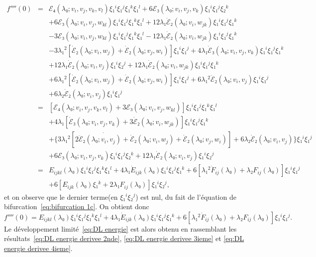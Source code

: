 \documentclass[12pt, final]{amsart}
\theoremstyle{definition}
\begin{document}
\begin{eqnarray*}
  f''''(0) & = & ℰ₄(λ₀ ; v_i, v_j, v_k {, v_l} ) ξ₁^i
  ξ₁^j ξ₁^k ξ₁^l + 6ℰ₃(λ₀ ; v_i, v_j, v_k) ξ₁^i
  ξ₁^j ξ₂^k\\
  &  &  + 6ℰ₃(λ₀ ; v_i, v_j, w_{k  l})
  ξ₁^i ξ₁^j ξ₁^k ξ₁^l + 12 λ₁  \dot{ℰ}₂
 (λ₀ ; v_{i }, w_{j  k}) ξ₁^i ξ₁^j ξ₁^k\\
  &  &  - 3ℰ₃(λ₀ ; v_i, v_j, w_{k  l})
  ξ₁^i ξ₁^j ξ₁^k ξ₁^l - 12 λ₁  \dot{ℰ}₂
 (λ₀ ; v_i, w_{j  k}) ξ₁^i ξ₁^j ξ₁^k\\
  &  &  - 3 λ₁^2  [\dot{ℰ}₂(λ₀ ; v_i, w_j)
  + \dot{ℰ}₂(λ₀ ; v_j, w_i)] ξ₁^i ξ₁^j + 4 λ₁
  \dot{ℰ}₃(λ₀ ; v_i, v_j, v_k) ξ₁^i ξ₁^j ξ₁^k\\
  &  &  + 12 λ₁  \dot{ℰ}₂(λ₀ ; v_i,
  v_j) ξ₁^i ξ₂^j + 12 λ₁  \dot{ℰ}₂(λ₀ ;
  v_i, w_{j  k}) ξ₁^i ξ₁^j ξ₁^k\\
  &  &  + 6 λ₁^2  [\dot{ℰ}₂(λ₀ ; v_i,
  w_j) + \dot{ℰ}₂(λ₀ ; v_j, w_i)] ξ₁^i ξ₁^j + 6
  λ₁^2  \ddot{ℰ}₂(λ₀ ; v_i, v_j) ξ₁^i ξ₁^j\\
  &  &  + 6 λ₂  \dot{ℰ}₂(λ₀ ; v_i, v_j)
  ξ₁^i ξ₁^j\\
  & = & \left[ ℰ₄(λ₀ ; v_i, v_j, v_k {, v_l} ) +
  3ℰ₃(λ₀ ; v_i, v_j, w_{k  l}) \right] ξ₁^i
  ξ₁^j ξ₁^k ξ₁^l\\
  &  &  + 4 λ₁  [\dot{ℰ}₃(λ₀ ; v_i, v_j,
  v_k) + 3 \dot{ℰ}₂(λ₀ ; v_i, w_{j  k})] ξ₁^i
  ξ₁^j ξ₁^k\\
  &  &  + \{ 3 λ₁^2  [\dot{2 \ddot{ℰ}₂
 (λ₀ ; v_i, v_j) + \dot{ℰ}}₂(λ₀ ; v_i, w_j) +
  \dot{ℰ}₂(λ₀ ; v_j, w_i)] + 6 λ₂
  \dot{ℰ}₂(λ₀ ; v_i, v_j) \} ξ₁^i ξ₁^j\\
  &  &  + 6ℰ₃(λ₀ ; v_i, v_j, v_k) ξ₁^i ξ₁^j
  ξ₂^k + 12 λ₁  \dot{ℰ}₂(λ₀ ; v_i, v_j)
  ξ₁^i ξ₂^j\\
  & = & E_{i  j  k  l}(λ₀) ξ₁^i ξ₁^j
  ξ₁^k ξ₁^l + 4 λ₁  \dot{E}_{i  j  k}
 (λ₀) ξ₁^i ξ₁^j ξ₁^k + 6 [λ₁^2  \dot{F}_{i
   j}(λ₀) + λ₂ F_{i  j}(λ₀)]
  ξ₁^i ξ₁^j\\
  &  &  + 6 [E_{i  j  k}(λ₀) ξ₁^k + 2
  λ₁ F_{i  j}(λ₀)] ξ₁^i ξ₂^j,
\end{eqnarray*}
et on observe que le dernier terme(en \(ξ₁^i ξ₂^j\)) est nul, du fait de l'équation de bifurcation~\eqref{eq:bifurcation 1c}. On obtient donc
\begin{equation}
  \label{eq:DL energie derivee 4ieme} f''''(0) = E_{i  j  k
   l}(λ₀) ξ₁^i ξ₁^j ξ₁^k ξ₁^l + 4 λ₁
  \dot{E}_{i  j  k}(λ₀) ξ₁^i ξ₁^j ξ₁^k + 6
  [λ₁^2  \dot{F}_{i  j}(λ₀) + λ₂ F_{i
   j}(λ₀)] ξ₁^i ξ₁^j .
\end{equation}
Le développement limité~\eqref{eq:DL energie} est alors obtenu en rassemblant les résultats~\eqref{eq:DL energie derivee 2nde}, \eqref{eq:DL energie derivee 3ieme} et \eqref{eq:DL energie derivee 4ieme}.
\end{document}

